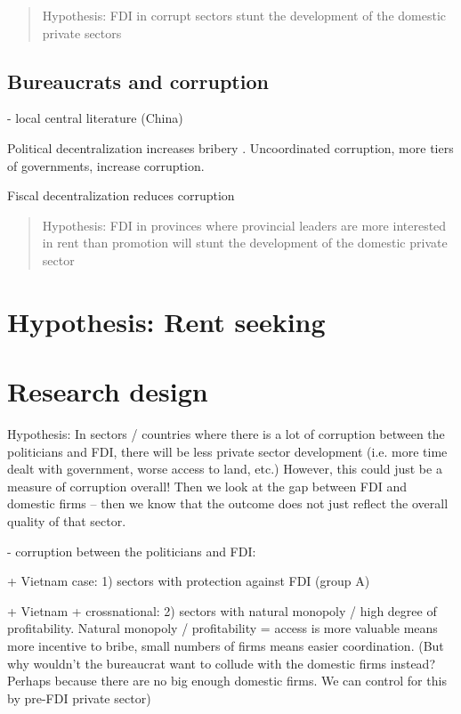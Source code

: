 \documentclass[12pt]{article}
\begin{document}
\begin{quote}
Hypothesis: FDI in corrupt sectors stunt the development of the domestic private sectors
\end{quote}

\subsection{Bureaucrats and corruption}



- local central literature (China)

Political decentralization increases bribery \citep{Fan2009}. Uncoordinated corruption, more tiers of governments, increase corruption.

Fiscal decentralization reduces corruption \citep{Guerra2009}

\begin{quote}
Hypothesis: FDI in provinces where provincial leaders are more interested in rent than promotion will stunt the development of the domestic private sector
\end{quote}

\section{Hypothesis: Rent seeking}

\section{Research design}

Hypothesis: In sectors / countries where there is a lot of corruption between the politicians and FDI, there will be less private sector development (i.e. more time dealt with government, worse access to land, etc.) However, this could just be a measure of corruption overall! Then we look at the gap between FDI and domestic firms -- then we know that the outcome does not just reflect the overall quality of that sector.

- corruption between the politicians and FDI: 

+ Vietnam case: 1) sectors with protection against FDI (group A) 

+ Vietnam + crossnational: 2) sectors with natural monopoly / high degree of profitability. Natural monopoly / profitability = access is more valuable means more incentive to bribe, small numbers of firms means easier coordination. (But why wouldn't the bureaucrat want to collude with the domestic firms instead? Perhaps because there are no big enough domestic firms. We can control for this by pre-FDI private sector)
\end{document}

